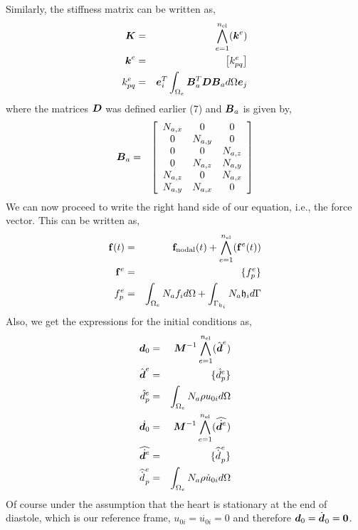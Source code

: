 Similarly, the stiffness matrix can be written as,
\begin{eqnarray}
  \boldsymbol{K} & = & \bigwedge_{e = 1}^{n_{\operatorname{el}}} (\boldsymbol{k}^e )
  \nonumber\\
  \boldsymbol{k}^e & = & \left[ k_{p q}^e \right] \nonumber\\
  k_{p q}^e & = & \boldsymbol{e}_i^T \int_{\Omega_e} \boldsymbol{B}_a^T
  \boldsymbol{D} \boldsymbol{B}_a d \Omega \boldsymbol{e}_j 
\end{eqnarray}
where the matrices $\boldsymbol{D}$ was defined earlier (7) and $\boldsymbol{B}_a$
is given by,
\begin{eqnarray*}
  \boldsymbol{B}_a & = & \left[ \begin{array}{ccc}
    N_{a, x} & 0 & 0\\
    0 & N_{a, y} & 0\\
    0 & 0 & N_{a, z}\\
    0 & N_{a, z} & N_{a, y}\\
    N_{a, z} & 0 & N_{a, x}\\
    N_{a, y} & N_{a, x} & 0
  \end{array} \right]
\end{eqnarray*}
We can now proceed to write the right hand side of our equation, i.e., the
force vector. This can be written as,
\begin{eqnarray}
  \mathbf{f}( t ) & = & \mathbf{f}_{\operatorname{nodal}} ( t ) +
  \bigwedge_{e = 1}^{n_{\operatorname{el}}} (\mathbf{f}^e ( t ) ) \nonumber\\
  \mathbf{f}^e & = & \{ f_p^e \} \nonumber\\
  f_p^e & = & \int_{\Omega_e} N_a f_i d \Omega +
  \int_{\Gamma_{\mathfrak{h}_i}} N_a \mathfrak{h}_i d \Gamma 
\end{eqnarray}
Also, we get the expressions for the initial conditions as,
\begin{eqnarray*}
  \boldsymbol{d}_0 & = & \boldsymbol{M}^{- 1} \bigwedge_{e =
  1}^{n_{\operatorname{el}}} ( \hat{\boldsymbol{d}}^e )\\
  \hat{\boldsymbol{d}}^e & = & \{ \hat{d}_p^e \}\\
  \hat{d}_p^e & = & \int_{\Omega_e} N_a \rho u_{0 i} d \Omega\\
  \dot{\boldsymbol{d}_0} & = & \boldsymbol{M}^{- 1} \bigwedge_{e =
  1}^{n_{\operatorname{el}}} ( \widehat{\dot{\boldsymbol{d}^e}}^{} )\\
  \widehat{\dot{\boldsymbol{d}^e}} & = & \{ \widehat{\dot{d_{}^{}}} _p^e \}\\
  \widehat{\dot{d_{}^{}}} _p^e & = & \int_{\Omega_e} N_a \rho \dot{u}_{0 i} d
  \Omega
\end{eqnarray*}
Of course under the assumption that the heart is stationary at the end of
diastole, which is our reference frame, $u_{0 i} = \dot{u_{0 i}} = 0$ and
therefore $\boldsymbol{d}_0 = \dot{\boldsymbol{d}_{}}_0 =\boldsymbol{0}$.


